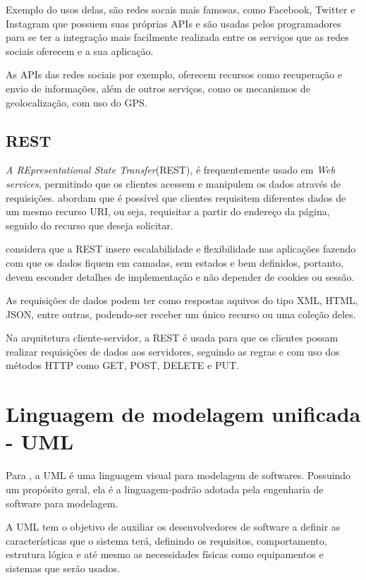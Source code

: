 Exemplo do usos delas, são redes socais mais famosas, como Facebook, Twitter e Instagram que possuem suas próprias APIs e são usadas pelos programadores para se ter a integração mais facilmente realizada entre os serviços que as redes sociais oferecem e a sua aplicação.

As APIs das redes sociais por exemplo, oferecem recursos como recuperação e envio de informações, além de outros serviços, como os mecanismos de geolocalização, com uso do GPS.

\subsection{REST}
\textit{A REpresentational State Transfer}(REST), é frequentemente usado em \textit{Web services}, permitindo que os clientes acessem e manipulem os dados através de requisições. \citet{zhou2014} abordam que é possível que clientes requisitem diferentes dados de um mesmo recurso URI, ou seja, requisitar a partir do endereço da página, seguido do recurso que deseja solicitar.  

\citet{makice2009} considera que a REST insere escalabilidade e flexibilidade nas aplicações fazendo com que os dados fiquem em camadas, sem estados e bem definidos, portanto, devem esconder detalhes de implementação e não depender de cookies ou sessão.

As requisições de dados podem ter como respostas aquivos do tipo XML, HTML, JSON, entre outras, podendo-ser receber um único recurso ou 
uma coleção deles.

Na arquitetura cliente-servidor, a REST é usada para que os clientes possam realizar requisições de dados aos servidores, seguindo as regras e com uso dos métodos HTTP como GET, POST, DELETE e PUT.  

\section{Linguagem de modelagem unificada - UML}
\label{sec:uml}
Para \citet{guedes2009}, a UML é uma linguagem visual para modelagem de softwares. Possuindo um propósito geral, ela é a linguagem-padrão adotada pela engenharia de software para modelagem.

A UML tem o objetivo de auxiliar os desenvolvedores de software a definir as características que o sistema terá, definindo os requisitos, comportamento, estrutura lógica e até mesmo as necessidades físicas como equipamentos e sistemas que serão usados. 

